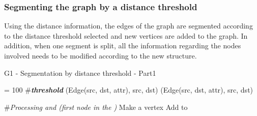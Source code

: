 \subsubsection{Segmenting the graph by a distance threshold}
Using the distance information, the edges of the graph are segmented according to the distance threshold selected and new vertices are added to the graph. In addition, when one segment is split, all the information regarding the nodes involved needs to be modified according to the new structure.
\begin{algorithm}[H]
	\caption{G1 - Segmentation by distance threshold - Part1} \label{alg:g1_1}
	\begin{algorithmic}[1]
		\State {} = 100 \#\textbf{\textit{threshold}}
    		    \State \Return (Edge(src, dst, attr), src, dst)
    		 \Else
    		        \State \Return (Edge(src, dst, attr), src, dst)
    		    \Else
	        		 \State {} 
                     \State {}
                     \State {}
        	        \State {}
        	        \State {}

                    \State \#\textit{Processing  and  (first node in the )}
    		        \State {}
                        \State Make  a vertex
                        \State {}
                        \State {}
                    \Else
                        \State Add  to 
                    \EndIf


\end{algorithmic}
\end{algorithm}
